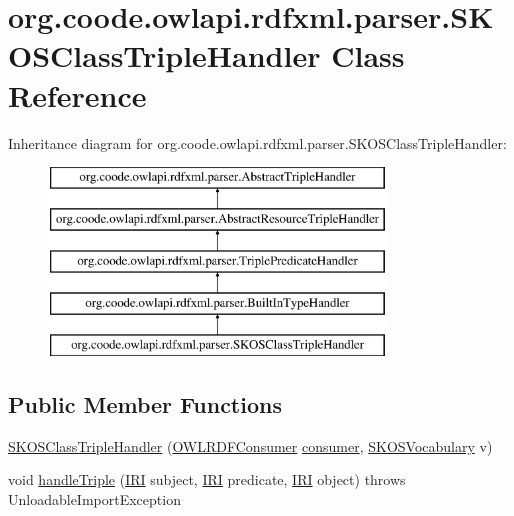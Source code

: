 \hypertarget{classorg_1_1coode_1_1owlapi_1_1rdfxml_1_1parser_1_1_s_k_o_s_class_triple_handler}{\section{org.\-coode.\-owlapi.\-rdfxml.\-parser.\-S\-K\-O\-S\-Class\-Triple\-Handler Class Reference}
\label{classorg_1_1coode_1_1owlapi_1_1rdfxml_1_1parser_1_1_s_k_o_s_class_triple_handler}
}
Inheritance diagram for org.\-coode.\-owlapi.\-rdfxml.\-parser.\-S\-K\-O\-S\-Class\-Triple\-Handler\-:\begin{figure}[H]
\begin{center}
\leavevmode
\includegraphics[height=5.000000cm]{classorg_1_1coode_1_1owlapi_1_1rdfxml_1_1parser_1_1_s_k_o_s_class_triple_handler}
\end{center}
\end{figure}
\subsection*{Public Member Functions}
\begin{DoxyCompactItemize}
\item 
\hyperlink{classorg_1_1coode_1_1owlapi_1_1rdfxml_1_1parser_1_1_s_k_o_s_class_triple_handler_a4a20e5c3334731c4c5d310dbb4757b6e}{S\-K\-O\-S\-Class\-Triple\-Handler} (\hyperlink{classorg_1_1coode_1_1owlapi_1_1rdfxml_1_1parser_1_1_o_w_l_r_d_f_consumer}{O\-W\-L\-R\-D\-F\-Consumer} \hyperlink{classorg_1_1coode_1_1owlapi_1_1rdfxml_1_1parser_1_1_abstract_triple_handler_a4ccf4d898ff01eb1cadfa04b23d54e9c}{consumer}, \hyperlink{enumorg_1_1semanticweb_1_1owlapi_1_1vocab_1_1_s_k_o_s_vocabulary}{S\-K\-O\-S\-Vocabulary} v)
\item 
void \hyperlink{classorg_1_1coode_1_1owlapi_1_1rdfxml_1_1parser_1_1_s_k_o_s_class_triple_handler_a9665617bb5bb80597ad2a8efd37fd0df}{handle\-Triple} (\hyperlink{classorg_1_1semanticweb_1_1owlapi_1_1model_1_1_i_r_i}{I\-R\-I} subject, \hyperlink{classorg_1_1semanticweb_1_1owlapi_1_1model_1_1_i_r_i}{I\-R\-I} predicate, \hyperlink{classorg_1_1semanticweb_1_1owlapi_1_1model_1_1_i_r_i}{I\-R\-I} object)  throws Unloadable\-Import\-Exception 
\end{DoxyCompactItemize}
